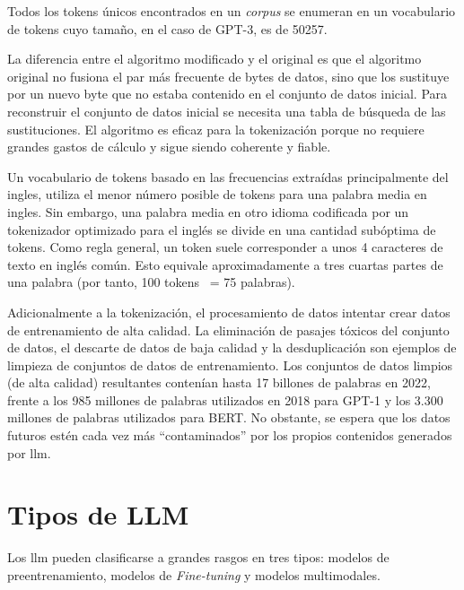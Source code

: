 Todos los tokens únicos encontrados en un \textit{corpus} se enumeran en un vocabulario de tokens cuyo tamaño, en el caso de GPT-3, es de 50257.

La diferencia entre el algoritmo modificado y el original es que el algoritmo original no fusiona el par más frecuente de bytes de datos, sino que los sustituye por un nuevo byte que no estaba contenido en el conjunto de datos inicial. Para reconstruir el conjunto de datos inicial se necesita una tabla de búsqueda de las sustituciones. El algoritmo es eficaz para la tokenización porque no requiere grandes gastos de cálculo y sigue siendo coherente y fiable.


Un vocabulario de tokens basado en las frecuencias extraídas principalmente del ingles, utiliza el menor número posible de tokens para una palabra media en ingles. Sin embargo, una palabra media en otro idioma codificada por un tokenizador optimizado para el inglés se divide en una cantidad subóptima de tokens. Como regla general, un token suele corresponder a unos 4 caracteres de texto en inglés común. Esto equivale aproximadamente a tres cuartas partes de una palabra (por tanto, 100 tokens ~= 75 palabras).

Adicionalmente a la tokenización, el procesamiento de datos intentar crear datos de entrenamiento de alta calidad. La eliminación de pasajes tóxicos del conjunto de datos, el descarte de datos de baja calidad y la desduplicación son ejemplos de limpieza de conjuntos de datos de entrenamiento. Los conjuntos de datos limpios (de alta calidad) resultantes contenían hasta 17 billones de palabras en 2022, frente a los 985 millones de palabras utilizados en 2018 para GPT-1 y los 3.300 millones de palabras utilizados para BERT. No obstante, se espera que los datos futuros estén cada vez más ``contaminados'' por los propios contenidos generados por \acrshort{llm}.

\section{Tipos de LLM}

Los \acrlong{llm} pueden clasificarse a grandes rasgos en tres tipos: modelos de preentrenamiento, modelos de \textit{Fine-tuning} y modelos multimodales\cite{scribbleData}.

